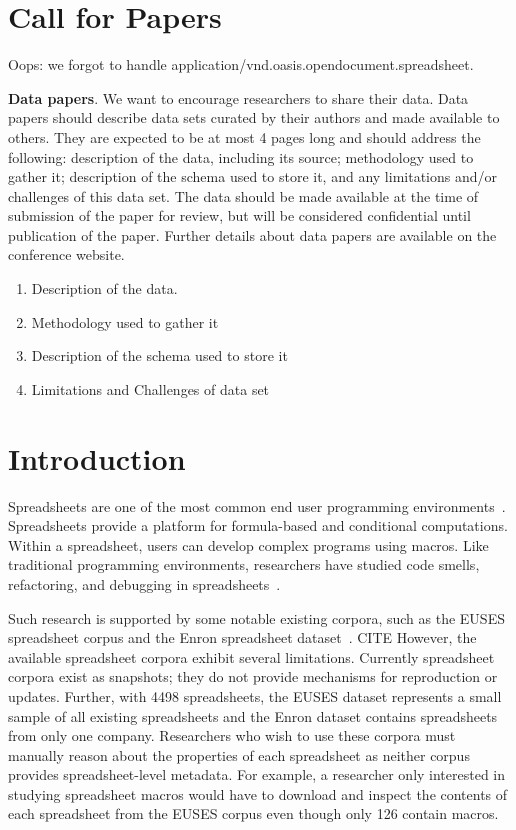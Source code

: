 \documentclass[conference]{IEEEtran}
\begin{document}
\section{Call for Papers}

Oops: we forgot to handle application/vnd.oasis.opendocument.spreadsheet.

\textbf{Data papers}. We want to encourage researchers to share their data. Data papers should describe data sets curated by their authors and made available to others. They are expected to be at most 4 pages long and should address the following: description of the data, including its source; methodology used to gather it; description of the schema used to store it, and any limitations and/or challenges of this data set. The data should be made available at the time of submission of the paper for review, but will be considered confidential until publication of the paper. Further details about data papers are available on the conference website. 

\begin{enumerate}
\item Description of the data.
\item Methodology used to gather it
\item Description of the schema used to store it
\item Limitations and Challenges of data set
\end{enumerate}

\section{Introduction}
Spreadsheets are one of the most common end user programming environments~\cite{Scaffidi2005}. 
Spreadsheets provide a platform for formula-based and conditional computations. 
Within a spreadsheet, users can develop complex programs using macros. 
Like traditional programming environments, researchers have studied code smells, refactoring, and debugging in spreadsheets~\cite{Pinzger2012,Badame2012,Abraham2007}.

Such research is supported by some notable existing corpora, such as the EUSES spreadsheet corpus and the Enron spreadsheet dataset~\cite{Fisher2005}. CITE
However, the available spreadsheet corpora exhibit several limitations.
Currently spreadsheet corpora exist as snapshots; they do not provide mechanisms for reproduction or updates.
Further, with 4498 spreadsheets, the EUSES dataset represents a small sample of all existing spreadsheets and the Enron dataset contains spreadsheets from only one company.
Researchers who wish to use these corpora must manually reason about the properties of each spreadsheet as neither corpus provides spreadsheet-level metadata.
For example, a researcher only interested in studying spreadsheet macros would have to download and inspect the contents of each spreadsheet from the EUSES corpus even though only 126 contain macros.
\end{document}
